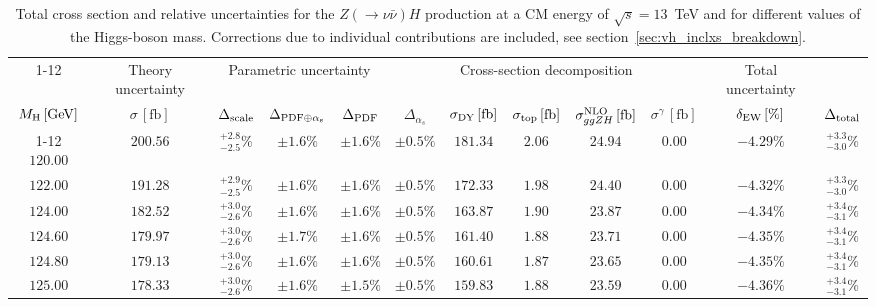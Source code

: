 \begin{landscape}
\begin{table}[ht!]
\caption{Total cross section and relative uncertainties for the $Z ( \rightarrow 
\nu \bar{\nu}) H$ production at a CM energy of  $\sqrt{s}=13$~TeV and for different values of the Higgs-boson mass. Corrections due to individual contributions are included, see section~\ref{sec:vh_inclxs_breakdown}.}
\label{tab:zh_nu_xs_13tev}
\centering
\scriptsize
{\renewcommand{\arraystretch}{1.4}
\begin{tabular}{| cc | c | ccc | ccccc | c |}
\cline{1-12}
\multicolumn{2}{|c|}{\(\sqrt{s} = 13\,\mathrm{TeV}\)} &
\multicolumn{1}{|c|}{Theory uncertainty} &
\multicolumn{3}{|c|}{Parametric uncertainty} &
\multicolumn{5}{|c|}{Cross-section decomposition} &
\multicolumn{1}{c|}{Total uncertainty} \\
\(M_\mathrm{H}\,[\mathrm{GeV}]\) & \(\sigma\,[\mathrm{fb}]\) &
\(\Delta_{\rm scale}\) &
\(\Delta_{\rm PDF\oplus\alpha_s}\) &
{\color{black!55}\(\Delta_{\rm PDF}\)} & {\color{black!55}\(\Delta_{\alpha_s}\)} &
\(\sigma_{\rm DY}\,[\mathrm{fb}]\) & \(\sigma_{\rm top}\,[\mathrm{fb}]\) & \(\sigma^{\rm NLO}_{ggZH}\,[\mathrm{fb}]\) & \(\sigma^\gamma\,[\mathrm{fb}]\) & \(\delta_{\rm EW}\,[\%]\) &
\(\Delta_{\rm total}\)
\\
\cline{1-12}
$120.00$ & $200.56$ & $^{+2.8}_{-2.5}\%$ & $\pm 1.6\%$ & {\color{black!55}$\pm 1.6\%$} & {\color{black!55}$\pm 0.5\%$} & $181.34$ & $2.06$ & $24.94$ & $0.00$ & $-4.29\%$ & $^{+3.3}_{-3.0}\%$ \\
$122.00$ & $191.28$ & $^{+2.9}_{-2.5}\%$ & $\pm 1.6\%$ & {\color{black!55}$\pm 1.6\%$} & {\color{black!55}$\pm 0.5\%$} & $172.33$ & $1.98$ & $24.40$ & $0.00$ & $-4.32\%$ & $^{+3.3}_{-3.0}\%$ \\
$124.00$ & $182.52$ & $^{+3.0}_{-2.6}\%$ & $\pm 1.6\%$ & {\color{black!55}$\pm 1.6\%$} & {\color{black!55}$\pm 0.5\%$} & $163.87$ & $1.90$ & $23.87$ & $0.00$ & $-4.34\%$ & $^{+3.4}_{-3.1}\%$ \\
$124.60$ & $179.97$ & $^{+3.0}_{-2.6}\%$ & $\pm 1.7\%$ & {\color{black!55}$\pm 1.6\%$} & {\color{black!55}$\pm 0.5\%$} & $161.40$ & $1.88$ & $23.71$ & $0.00$ & $-4.35\%$ & $^{+3.4}_{-3.1}\%$ \\
$124.80$ & $179.13$ & $^{+3.0}_{-2.6}\%$ & $\pm 1.6\%$ & {\color{black!55}$\pm 1.6\%$} & {\color{black!55}$\pm 0.5\%$} & $160.61$ & $1.87$ & $23.65$ & $0.00$ & $-4.35\%$ & $^{+3.4}_{-3.1}\%$ \\
$125.00$ & $178.33$ & $^{+3.0}_{-2.6}\%$ & $\pm 1.6\%$ & {\color{black!55}$\pm 1.5\%$} & {\color{black!55}$\pm 0.5\%$} & $159.83$ & $1.88$ & $23.59$ & $0.00$ & $-4.36\%$ & $^{+3.4}_{-3.1}\%$ \\

\end{tabular}}
\end{table}
\end{landscape}
